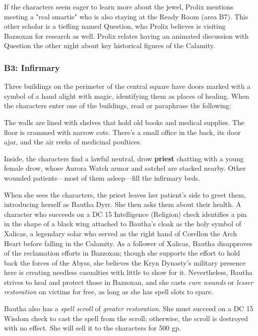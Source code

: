\documentclass[letterpaper, 11pt, bg=full, twocolumn]{dndbook}
\begin{document}
If the characters seem eager to learn more about the jewel, Prolix mentions meeting a "real smartie" who is also staying at the Ready Room (area B7). This other scholar is a tiefling named Question, who Prolix believes is visiting Bazzoxan for research as well. Prolix relates having an animated discussion with Question the other night about key historical figures of the Calamity.

\subsubsection{B3: Infirmary}

Three buildings on the perimeter of the central square have doors marked with a symbol of a hand alight with magic, identifying them as places of healing. When the characters enter one of the buildings, read or paraphrase the following:

\begin{DndReadAloud}
The walls are lined with shelves that hold old books and medical supplies. The floor is crammed with narrow cots. There's a small office in the back, its door ajar, and the air reeks of medicinal poultices.
\end{DndReadAloud}

Inside, the characters find a lawful neutral, drow \textbf{priest} chatting with a young female drow, whose Aurora Watch armor and satchel are stacked nearby. Other wounded patients---most of them asleep---fill the infirmary beds.

When she sees the characters, the priest leaves her patient's side to greet them, introducing herself as Bautha Dyrr. She then asks them about their health. A character who succeeds on a DC 15 Intelligence (Religion) check identifies a pin in the shape of a black wing attached to Bautha's cloak as the holy symbol of Xalicas, a legendary solar who served as the right hand of Corellon the Arch Heart before falling in the Calamity. As a follower of Xalicas, Bautha disapproves of the reclamation efforts in Bazzoxan; though she supports the effort to hold back the forces of the Abyss, she believes the Kryn Dynasty's military presence here is creating needless casualties with little to show for it. Nevertheless, Bautha strives to heal and protect those in Bazzoxan, and she casts \textit{cure wounds} or \textit{lesser restoration} on victims for free, as long as she has spell slots to spare.

Bautha also has a \textit{spell scroll} of \textit{greater restoration}. She must succeed on a DC 15 Wisdom check to cast the spell from the scroll; otherwise, the scroll is destroyed with no effect. She will sell it to the characters for 500 gp.
\end{document}
